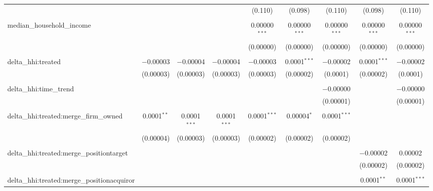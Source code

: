 \begin{table}[H]
{\begin{tabular}{@{\extracolsep{5pt}}lcccccccc}
   &  &  &  & (0.110) & (0.098) & (0.110) & (0.098) & (0.110) \\  

   & & & & & & & & \\  

  median\_household\_income &  &  &  & 0.00000$^{***}$ & 0.00000$^{***}$ & 0.00000$^{***}$ & 0.00000$^{***}$ & 0.00000$^{***}$ \\  

   &  &  &  & (0.00000) & (0.00000) & (0.00000) & (0.00000) & (0.00000) \\  

   & & & & & & & & \\  

  delta\_hhi:treated & $-$0.00003 & $-$0.00004 & $-$0.00004 & $-$0.00003 & 0.0001$^{***}$ & $-$0.00002 & 0.0001$^{***}$ & $-$0.00002 \\  

   & (0.00003) & (0.00003) & (0.00003) & (0.00003) & (0.00002) & (0.0001) & (0.00002) & (0.0001) \\  

   & & & & & & & & \\  

  delta\_hhi:time\_trend &  &  &  &  &  & $-$0.00000 &  & $-$0.00000 \\  

   &  &  &  &  &  & (0.00001) &  & (0.00001) \\  

   & & & & & & & & \\  

  delta\_hhi:treated:merge\_firm\_owned & 0.0001$^{**}$ & 0.0001$^{***}$ & 0.0001$^{***}$ & 0.0001$^{***}$ & 0.00004$^{*}$ & 0.0001$^{***}$ &  &  \\  

   & (0.00004) & (0.00003) & (0.00003) & (0.00002) & (0.00002) & (0.00002) &  &  \\  

   & & & & & & & & \\  

  delta\_hhi:treated:merge\_positiontarget &  &  &  &  &  &  & $-$0.00002 & 0.00002 \\  

   &  &  &  &  &  &  & (0.00002) & (0.00002) \\  

   & & & & & & & & \\  

  delta\_hhi:treated:merge\_positionacquiror &  &  &  &  &  &  & 0.0001$^{**}$ & 0.0001$^{***}$ \\  


\end{tabular}}
\end{table}
